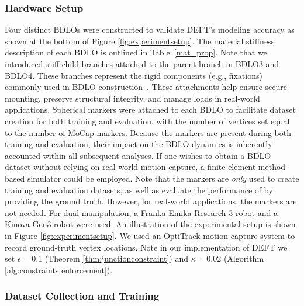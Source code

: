 \subsubsection{Hardware Setup}
Four distinct BDLOs were constructed to validate DEFT’s modeling accuracy as shown at the bottom of Figure \ref{fig:experimentsetup}. 
The material stiffness description of each BDLO is outlined in Table~\ref{mat_prop}. 
Note that we introduced stiff child branches attached to the parent branch in BDLO3 and BDLO4. 
These branches represent the rigid components (e.g., fixations) commonly used in BDLO construction~\cite{wireharnesinstruction}.
These attachments help ensure secure mounting, preserve structural integrity, and manage loads in real‐world applications.
Spherical markers were attached to each BDLO to facilitate dataset creation for both training and evaluation, with the number of vertices set equal to the number of MoCap markers. 
Because the markers are present during both training and evaluation, their impact on the BDLO dynamics is inherently accounted within all subsequent analyses.
If one wishes to obtain a BDLO dataset without relying on real-world motion capture, a finite element method-based simulator could be employed. 
Note that the markers are \emph{only} used to create training and evaluation datasets, as well as evaluate the performance of \DEFTn by providing the ground truth. 
However, for real-world applications, the markers are not needed.
For dual manipulation, a Franka Emika Research 3 robot and a Kinova Gen3 robot were used. 
An illustration of the experimental setup is shown in Figure \ref{fig:experimentsetup}.
We used an OptiTrack motion capture system to record ground-truth vertex locations. 
Note in our implementation of DEFT we set $\epsilon = 0.1$ (Theorem \ref{thm:junctionconstraint}) and $\kappa = 0.02$ (Algorithm \ref{alg:constraints enforcement}).

\subsubsection{Dataset Collection and Training}

